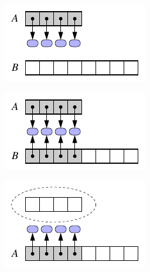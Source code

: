 \begin{figure}[H]
	\centering
	\begin{subfigure}
		\centering
		\includegraphics[width=0.32\linewidth]{img/figure-7-3a}
	\end{subfigure}%
	\begin{subfigure}
		\centering
		\includegraphics[width=0.32\linewidth]{img/figure-7-3b}
	\end{subfigure}%
	\begin{subfigure}
		\centering
		\includegraphics[width=0.32\linewidth]{img/figure-7-3c}
	\end{subfigure}
\end{figure}

\clearpage

